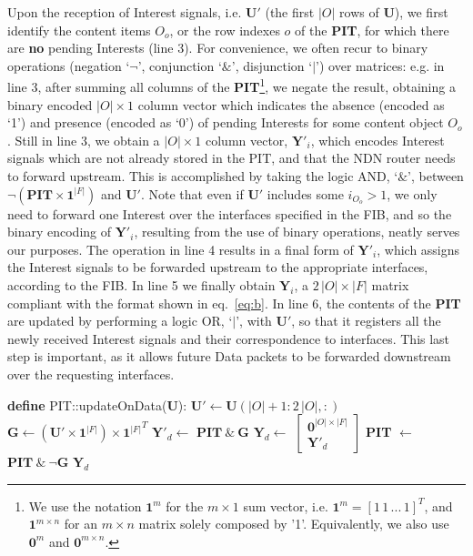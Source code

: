 Upon the reception of Interest signals, i.e. $\textbf{U}'$ (the first $|O|$ rows 
of $\textbf{U}$), we first identify the content items $O_o$, or the row indexes $o$ of the 
\textbf{PIT}, for which there are \textbf{no} pending Interests (line 3). For 
convenience, we often recur to binary operations (negation `$\neg$', 
conjunction `$\&$', disjunction `$|$') over matrices: e.g. in line 3, after 
summing all columns of the \textbf{PIT}\footnote{We use the notation $\textbf{1}^{m}$ for the $m \times 1$
sum vector, i.e. $\textbf{1}^{m} = [1\,1\,...\,1]^{T}$, and $\textbf{1}^{m \times n}$ for an $m \times n$ 
matrix solely composed by '1'. Equivalently, we also use $\textbf{0}^{m}$ and $\textbf{0}^{m \times n}$.}, we negate the 
result, obtaining a binary encoded $|O| \times 1$ 
column vector which indicates the absence (encoded as  `1') and presence 
(encoded as `0') of pending Interests for some content object $O_o$. Still in 
line 3, we obtain a $|O| \times 1$ column vector, $\textbf{Y}'_i$, which encodes 
Interest signals which are not already stored in the PIT, and that the NDN router needs to forward upstream. This is 
accomplished by taking the logic AND, `$\&$', between $\neg(\textbf{PIT} \times \textbf{1}^{|F|})$ and 
$\textbf{U}'$. Note that even 
if $\textbf{U}'$ includes some $i_{O_o} > 1$, we only need to forward one Interest 
over the interfaces specified in the FIB, and so the binary encoding of $\textbf{Y}'_i$, 
resulting from the use of binary operations, neatly serves our purposes. The operation 
in line 4 results in a final form of $\textbf{Y}'_i$, which assigns the 
Interest signals to be forwarded upstream to the appropriate interfaces, according to the FIB. 
In line 5 we finally obtain $\textbf{Y}_i$, a $2\,|O| \times |F|$ matrix compliant 
with the format shown in eq.~\ref{eq:b}. 
In line 6, the 
contents of the \textbf{PIT} are updated by performing a logic OR, `$|$', with $\textbf{U}'$, so 
that it registers all the newly received 
Interest signals and their correspondence to interfaces. This last step is important, 
as it allows future Data packets to be forwarded downstream over the requesting 
interfaces.\shortvertbreak

\begin{algorithmic}[1]

\State \textbf{define} PIT::updateOnData($\textbf{U}$):
    \Statex[2]
    \State $\textbf{U}' \leftarrow \textbf{U}(|O|+1:2\,|O|,:)$
    \State $\textbf{G} \leftarrow (\textbf{U}' \times \textbf{1}^{|F|}) \times {\textbf{1}^{|F|}}^{T}$
    \State $\textbf{Y}'_d \leftarrow$ $\textbf{PIT} \ \& \ \textbf{G}$
    \State $\textbf{Y}_d \leftarrow$ $\begin{bmatrix} \textbf{0}^{|O| \times |F|} \\ \textbf{Y}'_d \end{bmatrix}$
    \State \textbf{PIT} $\leftarrow$ $\textbf{PIT} \ \& \ \neg\textbf{G}$ 
    \State \Return $\textbf{Y}_d$

\end{algorithmic}\shortvertbreak

